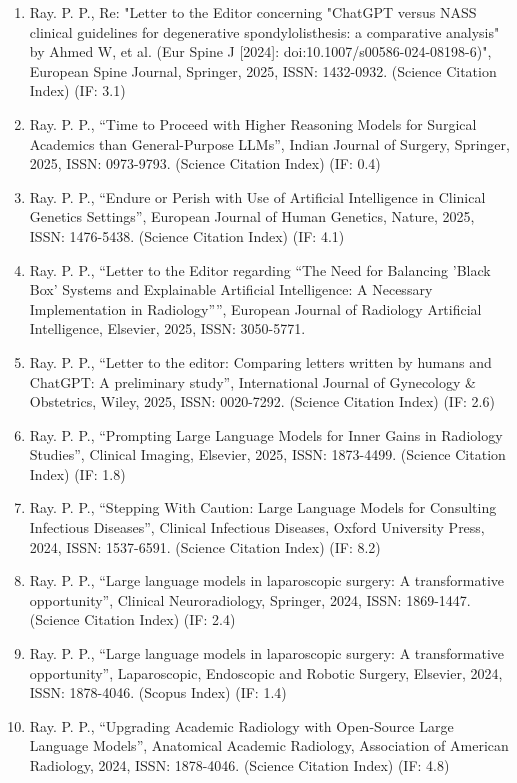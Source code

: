 \documentclass[11pt,a4paper]{moderncv}
\begin{document}
\begin{adjustwidth}{6em}{0pt}
\begin{enumerate}
		\item Ray. P. P., Re: "Letter to the Editor concerning "ChatGPT versus NASS clinical guidelines for degenerative spondylolisthesis: a comparative analysis" by Ahmed W, et al. (Eur Spine J [2024]: doi:10.1007/s00586-024-08198-6)", European Spine Journal, Springer, 2025, ISSN: 1432-0932. (Science Citation Index) (IF: 3.1)
		\item Ray. P. P., “Time to Proceed with Higher Reasoning Models for Surgical Academics than General-Purpose LLMs”, Indian Journal of Surgery, Springer, 2025, ISSN: 0973-9793. (Science Citation Index) (IF: 0.4)
		\item Ray. P. P., “Endure or Perish with Use of Artificial Intelligence in Clinical Genetics Settings”, European Journal of Human Genetics, Nature, 2025, ISSN: 1476-5438. (Science Citation Index) (IF: 4.1)
		\item Ray. P. P., “Letter to the Editor regarding “The Need for Balancing 'Black Box' Systems and Explainable Artificial Intelligence: A Necessary Implementation in Radiology””, European Journal of Radiology Artificial Intelligence, Elsevier, 2025, ISSN: 3050-5771.
		\item Ray. P. P., “Letter to the editor: Comparing letters written by humans and ChatGPT: A preliminary study”, International Journal of Gynecology \& Obstetrics, Wiley, 2025, ISSN: 0020-7292. (Science Citation Index) (IF: 2.6)
		\item Ray. P. P., “Prompting Large Language Models for Inner Gains in Radiology Studies”, Clinical Imaging, Elsevier, 2025, ISSN: 1873-4499. (Science Citation Index) (IF: 1.8)
		\item Ray. P. P., “Stepping With Caution: Large Language Models for Consulting Infectious Diseases”, Clinical Infectious Diseases, Oxford University Press, 2024, ISSN: 1537-6591. (Science Citation Index) (IF: 8.2)
		\item Ray. P. P., “Large language models in laparoscopic surgery: A transformative opportunity”, Clinical Neuroradiology, Springer, 2024, ISSN: 1869-1447. (Science Citation Index) (IF: 2.4)
		\item Ray. P. P., “Large language models in laparoscopic surgery: A transformative opportunity”, Laparoscopic, Endoscopic and Robotic Surgery, Elsevier, 2024, ISSN: 1878-4046. (Scopus Index) (IF: 1.4)
		\item Ray. P. P., “Upgrading Academic Radiology with Open-Source Large Language Models”, Anatomical Academic Radiology, Association of American Radiology, 2024, ISSN: 1878-4046. (Science Citation Index) (IF: 4.8)

\end{enumerate}
\end{adjustwidth}
\end{document}
